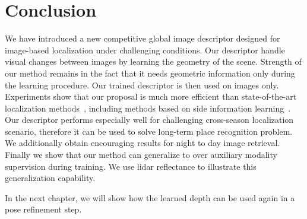 \section{Conclusion}
\label{sec:conclusion}

We have introduced a new competitive global image descriptor designed for image-based localization under challenging conditions. Our descriptor handle visual changes between images by learning the geometry of the scene. Strength of our method remains in the fact that it needs geometric information only during the learning procedure. Our trained descriptor is then used on images only. Experiments show that our proposal is much more efficient than state-of-the-art localization methods~\cite{Arandjelovic2017, Radenovic2017}, including methods based on side information learning~\cite{Hoffman2016}. Our descriptor performs especially well for challenging cross-season localization scenario, therefore it can be used to solve long-term place recognition problem. We additionally obtain encouraging results for night to day image retrieval. Finally we show that our method can generalize to over auxiliary modality supervision during training. We use lidar reflectance to illustrate this generalization capability.

In the next chapter, we will show how the learned depth can be used again in a pose refinement step. 